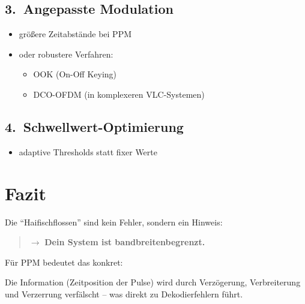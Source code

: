 \documentclass[a4paper,12pt]{article}
\begin{document}
\subsection*{3.\ Angepasste Modulation}

\begin{itemize}
  \item größere Zeitabstände bei PPM
  \item oder robustere Verfahren:
    \begin{itemize}
      \item OOK (On-Off Keying)
      \item DCO-OFDM (in komplexeren VLC-Systemen)
    \end{itemize}
\end{itemize}

\subsection*{4.\ Schwellwert-Optimierung}

\begin{itemize}
  \item adaptive Thresholds statt fixer Werte
\end{itemize}

\section*{Fazit}

Die \enquote{Haifischflossen} sind kein Fehler, sondern ein Hinweis:

\begin{quote}
  $\rightarrow$ \textbf{Dein System ist bandbreitenbegrenzt.}
\end{quote}

Für PPM bedeutet das konkret:

Die Information (Zeitposition der Pulse) wird durch Verzögerung, Verbreiterung und Verzerrung
verfälscht -- was direkt zu Dekodierfehlern führt.
\end{document}
